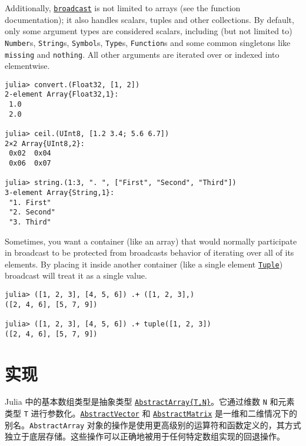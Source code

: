 Additionally, \hyperlink{616124539803111168}{\texttt{broadcast}} is not limited to arrays (see the function documentation); it also handles scalars, tuples and other collections.  By default, only some argument types are considered scalars, including (but not limited to) \texttt{Number}s, \texttt{String}s, \texttt{Symbol}s, \texttt{Type}s, \texttt{Function}s and some common singletons like \texttt{missing} and \texttt{nothing}. All other arguments are iterated over or indexed into elementwise.




\begin{verbatim}
julia> convert.(Float32, [1, 2])
2-element Array{Float32,1}:
 1.0
 2.0

julia> ceil.(UInt8, [1.2 3.4; 5.6 6.7])
2×2 Array{UInt8,2}:
 0x02  0x04
 0x06  0x07

julia> string.(1:3, ". ", ["First", "Second", "Third"])
3-element Array{String,1}:
 "1. First"
 "2. Second"
 "3. Third"
\end{verbatim}



Sometimes, you want a container (like an array) that would normally participate in broadcast to be {\textquotedbl}protected{\textquotedbl} from broadcast{\textquotesingle}s behavior of iterating over all of its elements. By placing it inside another container (like a single element \hyperlink{17462354060312563026}{\texttt{Tuple}}) broadcast will treat it as a single value.




\begin{verbatim}
julia> ([1, 2, 3], [4, 5, 6]) .+ ([1, 2, 3],)
([2, 4, 6], [5, 7, 9])

julia> ([1, 2, 3], [4, 5, 6]) .+ tuple([1, 2, 3])
([2, 4, 6], [5, 7, 9])
\end{verbatim}



\hypertarget{2709595058891761459}{}


\section{实现}



Julia 中的基本数组类型是抽象类型 \hyperlink{6514416309183787338}{\texttt{AbstractArray\{T,N\}}}。它通过维数 \texttt{N} 和元素类型 \texttt{T} 进行参数化。\hyperlink{12517057979818647811}{\texttt{AbstractVector}} 和 \hyperlink{17966587371929951201}{\texttt{AbstractMatrix}} 是一维和二维情况下的别名。\texttt{AbstractArray} 对象的操作是使用更高级别的运算符和函数定义的，其方式独立于底层存储。这些操作可以正确地被用于任何特定数组实现的回退操作。



